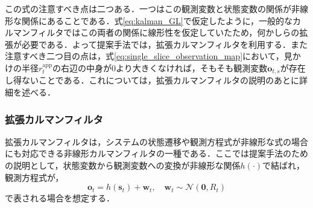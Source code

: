     この式の注意すべき点は二つある．一つはこの観測変数と状態変数の関係が非線形な関係にあることである．式\ref{eq:kalman_GL}で仮定したように，一般的なカルマンフィルタではこの両者の関係に線形性を仮定していたため，何かしらの拡張が必要である．よって提案手法では，拡張カルマンフィルタ\cite{bishop2001introduction}を利用する．また注意すべき二つ目の点は，式\ref{eq:single_slice_observation_map}において，見かけの半径$r_t^{\text{app}}$の右辺の中身が$0$より大きくなければ，そもそも観測変数$\bm{o}_{t,s}$が存在し得ないことである．これについては，拡張カルマンフィルタの説明のあとに詳細を述べる．

        \subsubsection{拡張カルマンフィルタ}
        拡張カルマンフィルタ\cite{bishop2001introduction}は，システムの状態遷移や観測方程式が非線形な式の場合にも対応できる非線形カルマンフィルタの一種である．ここでは提案手法のための説明として，状態変数から観測変数への変換が非線形な関係$h(\cdot)$で結ばれ，観測方程式が，
        \begin{equation}
            \label{eq:ekf_nonlinear}
            \bm{o}_t = h(\bm{s}_t) + \bm{w}_t, \quad \bm{w}_t \sim \mathcal{N}(\bm{0}, R_t)
        \end{equation}
        で表される場合を想定する．

